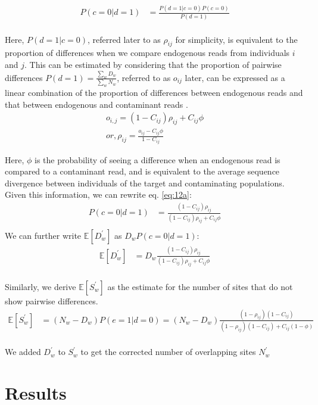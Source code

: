 \documentclass[12pt, letterpaper]{article}
\begin{document}
\begin{align}\label{eq:12a}
    P(c=0|d=1) &= \frac{P(d=1|c=0)P(c=0)}{P(d=1)} \nonumber\\
\end{align}

Here, $P(d=1|c=0)$, referred later to as $\rho_{ij}$ for simplicity, is equivalent to the proportion of differences when we compare endogenous reads from individuals $i$ and $j$. This can be estimated by considering that the proportion of pairwise differences $P(d=1) =\frac{\sum_w D_w}{\sum_w N_w}$, referred to as $o_{ij}$ later, can be expressed as a linear combination of the proportion of differences between endogenous reads and that between endogenous and contaminant reads \cite{peyregne_present-day_2020}. 
\begin{align}\label{eq:13}
    o_{i,j} = (1-C_{ij}) \rho_{ij} + C_{ij} \phi \nonumber\\
    or, \rho_{ij} = \frac{o_{ij} - C_{ij} \phi} {1 - C_{ij}}
\end{align}

Here, $\phi$ is the probability of seeing a difference when an endogenous read is compared to a contaminant read, and is equivalent to the average sequence divergence between individuals of the target and contaminating populations.
Given this information, we can rewrite eq. \ref{eq:12a}:
\begin{align}\label{eq:12}
    P(c=0|d=1) &= \frac{(1 - C_{ij}) \rho_{ij}}{(1 - C_{ij}) \rho_{ij} + C_{ij} \phi} \nonumber\\
\end{align}
We can further write $\mathbb{E}[D_w^{'}]$ as $D_w P(c=0|d=1)$:
\begin{align}
    \mathbb{E}[D_w^{'}] &= D_w\frac{(1-C_{ij})\rho_{ij}}{(1-C_{ij}) \rho_{ij} + C_{ij} \phi}\\
\end{align}

Similarly, we derive $\mathbb{E}[S_w^{'}]$ as the estimate for the number of sites that do not show pairwise differences.
\begin{align}
    \mathbb{E}[S_w^{'}] &= (N_w-D_w) P(e=1|d=0) = (N_w - D_w)\frac{(1-\rho_{ij})(1-C_{ij})}{(1-\rho_{ij})(1-C_{ij}) + C_{ij}(1-\phi)}\\
\end{align}

We added $D_w^{'}$ to $S_w^{'}$ to get the corrected number of overlapping sites $N_w^{'}$  


\section{Results}\label{results}
\end{document}
